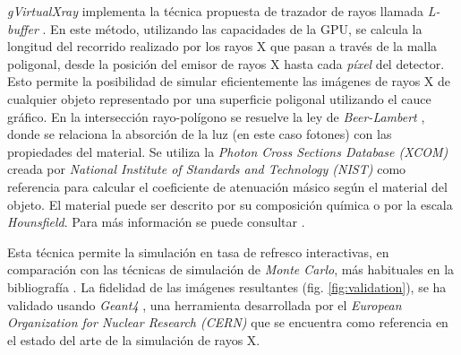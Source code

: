 \emph{gVirtualXray} implementa la técnica propuesta de trazador de rayos llamada \emph{L-buffer} \cite{Freud2006175}. En este método, utilizando las capacidades de la \ac{GPU}, se calcula la longitud del recorrido realizado por los rayos X que pasan a través de la malla poligonal, desde la posición del emisor de rayos X hasta cada \emph{píxel} del detector. Esto permite la posibilidad de simular eficientemente las imágenes de rayos X de cualquier objeto representado por una superficie poligonal utilizando el cauce gráfico. En la intersección rayo-polígono se resuelve la ley de \emph{Beer-Lambert} \cite{sujar:hal}, donde se relaciona la absorción de la luz (en este caso fotones) con las propiedades del material. Se utiliza la \emph{Photon Cross Sections Database (XCOM)} creada por \emph{National Institute of Standards and Technology (NIST)} \cite{XCOM} como referencia para calcular el coeficiente de atenuación másico según el material del objeto. El material puede ser descrito por su composición química o por la escala \emph{Hounsfield}.  %
Para más información se puede consultar \cite{vidal2009simulation}.

Esta técnica permite la simulación en tasa de refresco interactivas, en comparación con las técnicas de  simulación de \emph{Monte Carlo}, más habituales en la bibliografía \cite{PENELOPE,badal2009}. La fidelidad de las imágenes resultantes (fig. \ref{fig:validation}), se ha validado usando \emph{Geant4} \cite{Agostinelli2003250}, una herramienta desarrollada por el \emph{European Organization for Nuclear Research (CERN)} que se encuentra como referencia en el estado del arte de la simulación de rayos X.

